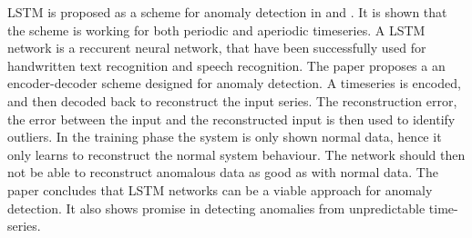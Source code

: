         
        LSTM is proposed as a scheme for anomaly detection in \cite{Malhotra2016} and \cite{Malhotra}. It is shown that the scheme is working for both periodic and aperiodic timeseries. A LSTM network is a reccurent neural network, that have been successfully used for handwritten text recognition and speech recognition. The paper proposes a an encoder-decoder scheme designed for anomaly detection. A timeseries is encoded, and then decoded back to reconstruct the input series. The reconstruction error, the error between the input and the reconstructed input is then used to identify outliers. In the training phase the system is only shown normal data, hence it only learns to reconstruct the normal system behaviour. The network should then not be able to reconstruct anomalous data as good as with normal data. The paper concludes that LSTM networks can be a viable approach for anomaly detection. It also shows promise in detecting anomalies from unpredictable time-series.      
        